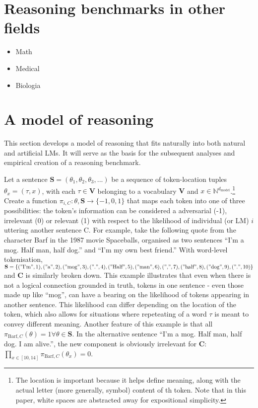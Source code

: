 \documentclass[
]{article}
\begin{document}
\section{Reasoning benchmarks in other
fields}\label{reasoning-benchmarks-in-other-fields}

\begin{itemize}
\item
  Math
\item
  Medical
\item
  Biologia
\end{itemize}

\section{A model of reasoning}\label{a-model-of-reasoning}

This section develops a model of reasoning that fits naturally into both
natural and artificial LMs. It will serve as the basis for the
subsequent analyses and empirical creation of a reasoning benchmark.

Let a sentence \(\mathbf{S} = (\theta_1, \theta_2, \theta_3, ...)\) be a
sequence of token-location tuples \(\theta_x = (\tau, x)\), with each
\(\tau \in \mathbf{V}\) belonging to a vocabulary \(\mathbf{V}\) and
\(x \in \mathbb{N}^{d_{\text{model}}}\).\footnote{The location is
  important because it helps define meaning, along with the actual
  letter (more generally, symbol) content of th token. Note that in this
  paper, white spaces are abstracted away for expositional simplicity.}
Create a function \(\pi_{i, C} : \theta, \mathbf{S} \to \{-1, 0, 1\}\)
that maps each token into one of three possibilities: the token's
information can be considered a adversarial (-1), irrelevant (0) or
relevant (1) with respect to the likelihood of individual (or LM) \(i\)
uttering another sentence C. For example, take the following quote from
the character Barf in the 1987 movie Spaceballs, organised as two
sentences ``I'm a mog. Half man, half dog.'' and ``I'm my own best
friend.'' With word-level tokenisation,
\(\mathbf{S} = \{("\text{I'm}", 1), ("\text{a}", 2), ("\text{mog}", 3), ("\text{.}", 4), ("\text{Half}", 5), ("\text{man}", 6), ("\text{,}", 7), ("\text{half}", 8), ("\text{dog}", 9), ("\text{.}", 10)\}\)
and \(\mathbf{C}\) is similarly broken down. This example illustrates
that even when there is not a logical connection grounded in truth,
tokens in one sentence - even those made up like ``mog'', can have a
bearing on the likelihood of tokens appearing in another sentence. This
likelihood can differ depending on the location of the token, which also
allows for situations where repeteating of a word \(\tau\) is meant to
convey different meaning. Another feature of this example is that all
\(\pi_{\text{Barf}, C}(\theta) = 1 \forall \theta \in \mathbf{S}\). In
the alternative sentence ``I'm a mog. Half man, half dog. I am alive.'',
the new component is obviously irrelevant for \(\mathbf{C}\):
\(\prod_{x \in [10, 14]} \pi_{\text{Barf}, C}(\theta_x) = 0\).
\end{document}
